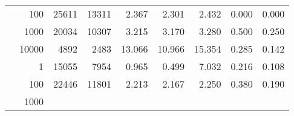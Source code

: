 \begin{table}
\begin{tabular}{rrrrrrrrr}
	            
					 &  
					 
					\multirow{ 1 }{*}{ 100 } &
					
						
							    
							     25611  & 13311  
	                           & 2.367 & 2.301 & 2.432
	                           & 0.000 & 0.000  \\
	                
	            
					 &  
					 
					\multirow{ 1 }{*}{ 1000 } &
					
						
							    
							     20034  & 10307  
	                           & 3.215 & 3.170 & 3.280
	                           & 0.500 & 0.250  \\
	                
	            
					 &  
					 
					\multirow{ 1 }{*}{ 10000 } &
					
						
							    
							     4892  & 2483  
	                           & 13.066 & 10.966 & 15.354
	                           & 0.285 & 0.142  \\
	                
	            
	        
				\noalign{\smallskip}\hline
				\multirow{ 4 }{*}{ 250000 } &
				
					
					 
					\multirow{ 1 }{*}{ 1 } &
					
						
							    
							     15055  & 7954  
	                           & 0.965 & 0.499 & 7.032
	                           & 0.216 & 0.108  \\
	                
	            
					 &  
					 
					\multirow{ 1 }{*}{ 100 } &
					
						
							    
							     22446  & 11801  
	                           & 2.213 & 2.167 & 2.250
	                           & 0.380 & 0.190  \\
	                
	            
					 &  
					 
					\multirow{ 1 }{*}{ 1000 } &
					
						
							    

\end{tabular}
\end{table}
